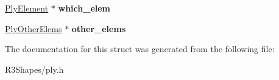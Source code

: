 \begin{DoxyCompactItemize}
\item 
\hyperlink{struct_ply_element}{Ply\+Element} $\ast$ {\bfseries which\+\_\+elem}\hypertarget{struct_ply_file_a8446d1253e51c33fc1149d87d60d91c9}{}\label{struct_ply_file_a8446d1253e51c33fc1149d87d60d91c9}

\item 
\hyperlink{struct_ply_other_elems}{Ply\+Other\+Elems} $\ast$ {\bfseries other\+\_\+elems}\hypertarget{struct_ply_file_aceb5a35f93d4ab5df12713e1b62e838b}{}\label{struct_ply_file_aceb5a35f93d4ab5df12713e1b62e838b}

\end{DoxyCompactItemize}


The documentation for this struct was generated from the following file\+:\begin{DoxyCompactItemize}
\item 
R3\+Shapes/ply.\+h\end{DoxyCompactItemize}
